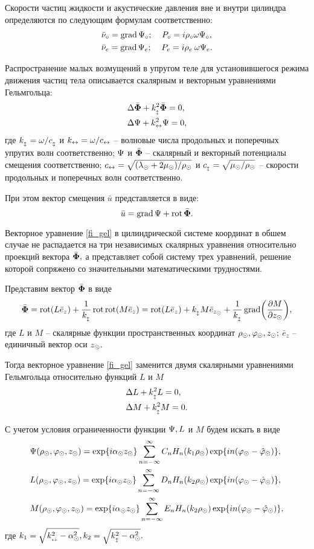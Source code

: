 Скорости частиц жидкости и акустические давления вне и внутри цилиндра определяются по следующим формулам соответственно:
\begin{align*}
&\bar{\nu}\c=\grad\P\c;\:\:\:\:\:P\c=i\r\c\omega\P\c,\\
&\bar{\nu}\en=\grad\P\en;\:\:\:\:\:P\en=i\r\en\:\omega\P\en.
\end{align*}

Распространение малых возмущений в упругом теле для установившегося режима движения частиц тела описывается скалярным и векторным уравнениями Гельмгольца:
\begin{align}
&\Lap\bar{\F}+k_{\popr}^2\bar{\F}=0,\\
&\Lap\P+k\prodol^2\P=0,\label{fi_gel}
\end{align}
где $k_{\popr}=\omega/c_{\popr}$ и $k\prodol=\omega/c\prodol$ -- волновые числа продольных и поперечных упругих волн соответственно; $\P$ и $\bar\F$ -- скалярный и векторный потенциалы смещения соответственно; $c\prodol=\sqrt{(\lambda\cyl+2\mu\cyl)/\r\cyl}$ и $c_{\popr}=\sqrt{\mu\cyl/\r\cyl}$ -- скорости продольных и поперечных волн соответственно.

При этом вектор смещения $\bar{u}$ представляется в виде:
\begin{equation}
\bar{u}=\grad\P+\rot\bar{\F}.
\end{equation}

Векторное уравнение \eqref{fi_gel} в цилиндрической системе координат в обшем случае не распадается на три независимых скалярных уравнения относительно проекций вектора $\bar{\F},$ а представляет собой систему трех уравнений, решение которой сопряжено со значительными математическими трудностями.

Представим вектор $\bar\F$ в виде
$$\bar\F=\rot(L\bar{e}_z)+\frac1{k_{\popr}}\rot\rot(M\bar{e}_z)=\rot(L\bar{e}_z)+k_{\popr} M\bar{e}_{z\cyl}+\frac1{k_{\popr}}\grad\biggl(\frac{\partial M}{\partial z\cyl}\biggr),$$
где $L$ и $M$ -- скалярные функции пространственных координат $\r\cyl, \varphi\cyl, z\cyl;$
\newline
$\bar{e}_z$ -- единичный вектор оси $z\cyl.$

Тогда векторное уравнение \eqref{fi_gel} заменится двумя скалярными уравнениями Гельмгольца относительно функций $L$ и $M$
\begin{align*}
&\Lap L+k_{\popr}^2L=0,\\
&\Lap M+k_{\popr}^2M=0.
\end{align*}

С учетом условия ограниченности функции $\P, L$ и $M$ будем искать в виде
\begin{align}
&\P(\r\cyl, \f\cyl, z\cyl)= \exp\{i\alpha\cyl z\cyl\}\sum_{n=-\infty}^{\infty}C_nH_n(k_1 \r\cyl)\exp\{in(\f\cyl-\hat\f\cyl)\},\label{pazloj_psi}\\
&L(\r\cyl, \f\cyl, z\cyl)= \exp\{i\alpha\cyl z\cyl\}\sum_{n=-\infty}^{\infty}D_nH_n(k_2 \r\cyl)\exp\{in(\f\cyl-\hat\f\cyl)\},\label{pazloj_l}\\
&M(\r\cyl, \f\cyl, z\cyl)= \exp\{i\alpha\cyl z\cyl\}\sum_{n=-\infty}^{\infty}E_nH_n(k_2 \r\cyl)\exp\{in(\f\cyl-\hat\f\cyl)\},\label{pazloj_m}
\end{align}
где $k_1=\sqrt{k_{\prodol}^2-\alpha^2\cyl}, k_2=\sqrt{k_{\popr}^2-\alpha^2\cyl}.$

